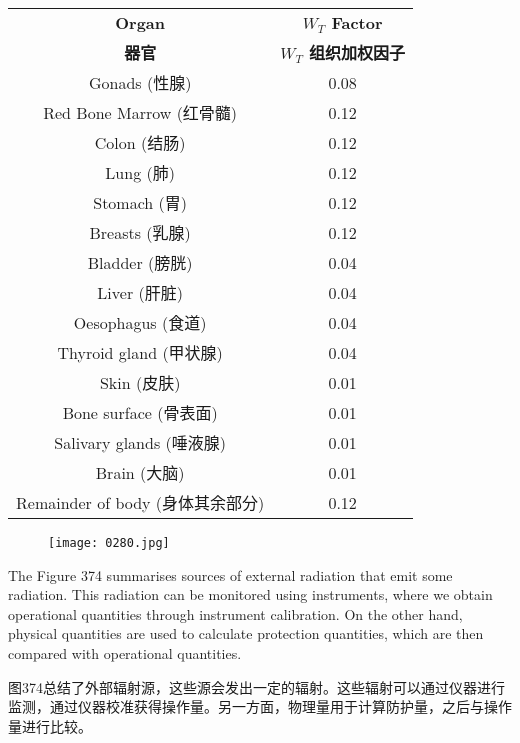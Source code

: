 \documentclass[dvipsnames, svgnames,a4paper,11pt]{article}
\begin{document}
\begin{table}[h]
      \centering
      \label{table8}
      \begin{tabular}{cc}
      \toprule
      \textbf{Organ} & \textbf{$W_T$ Factor} \\
      \textbf{器官} & \textbf{$W_T$ 组织加权因子} \\
      \midrule
      Gonads (性腺) & 0.08 \\
      Red Bone Marrow (红骨髓) & 0.12 \\
      Colon (结肠) & 0.12 \\
      Lung (肺) & 0.12 \\
      Stomach (胃) & 0.12 \\
      Breasts (乳腺) & 0.12 \\
      Bladder (膀胱) & 0.04 \\
      Liver (肝脏) & 0.04 \\
      Oesophagus (食道) & 0.04 \\
      Thyroid gland (甲状腺) & 0.04 \\
      Skin (皮肤) & 0.01 \\
      Bone surface (骨表面) & 0.01 \\
      Salivary glands (唾液腺) & 0.01 \\
      Brain (大脑) & 0.01 \\
      Remainder of body (身体其余部分) & 0.12 \\
      \bottomrule
      \end{tabular}
      \end{table}

      \begin{figure}[h]
        \centering
        \texttt{[image: 0280.jpg]}  
         \label{fig373}
    \end{figure}




The Figure 374 summarises sources of external radiation that emit some radiation. This radiation can be monitored using instruments, where we obtain operational quantities through instrument calibration. On the other hand, physical quantities are used to calculate protection quantities, which are then compared with operational quantities.  

图374总结了外部辐射源，这些源会发出一定的辐射。这些辐射可以通过仪器进行监测，通过仪器校准获得操作量。另一方面，物理量用于计算防护量，之后与操作量进行比较。
\end{document}
